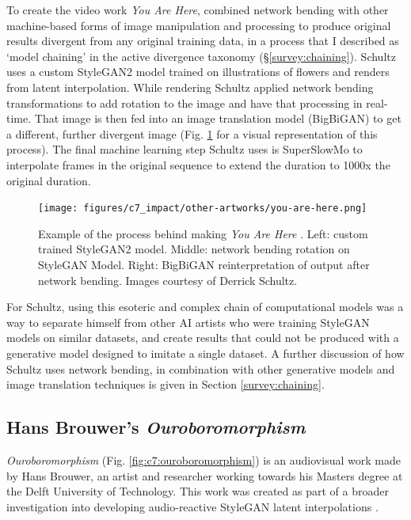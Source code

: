 To create the video work \textit{You Are Here}, \citep{schutlz2020you} combined network bending with other machine-based forms of image manipulation and processing to produce original results divergent from any original training data, in a process that I described as `model chaining' in the active divergence taxonomy (\S \ref{survey:chaining}).
Schultz uses a custom StyleGAN2 model trained on illustrations of flowers and renders from latent interpolation. 
While rendering Schultz applied network bending transformations to add rotation to the image and have that processing in real-time. 
That image is then fed into an image translation model (BigBiGAN) \citep{donahue2019large} to get a different, further divergent image (Fig. \ref{fig:c7:you-are-here} for a visual representation of this process). 
The final machine learning step Schultz uses is SuperSlowMo \citep{jiang2018super} to interpolate frames in the original sequence to extend the duration to 1000x the original duration.

\begin{figure}[!htb]
    \centering
    \captionsetup{justification=centering}
    \texttt{[image: figures/c7\_impact/other-artworks/you-are-here.png]}
    \caption[Example of the process behind making \textit{You Are Here}]{Example of the process behind making \textit{You Are Here} \citep{schutlz2020you}. Left: custom trained StyleGAN2 model. Middle: network bending rotation on StyleGAN Model. Right: BigBiGAN reinterpretation of output after network bending. Images courtesy of Derrick Schultz.}
    \label{fig:c7:you-are-here}
\end{figure}

For Schultz, using this esoteric and complex chain of computational models was a way to separate himself from other AI artists who were training StyleGAN models on similar datasets, and create results that could not be produced with a generative model designed to imitate a single dataset. 
A further discussion of how Schultz uses network bending, in combination with other generative models and image translation techniques is given in Section \ref{survey:chaining}.

\subsection{Hans Brouwer's \textit{Ouroboromorphism}}

\textit{Ouroboromorphism} \citep{brouwer2020ourobo}  (Fig. \ref{fig:c7:ouroboromorphism}) is an audiovisual work made by Hans Brouwer, an artist and researcher working towards his Masters degree at the Delft University of Technology. 
This work was created as part of a broader investigation into developing audio-reactive StyleGAN latent interpolations \citep{brouwer2020audio}. 

